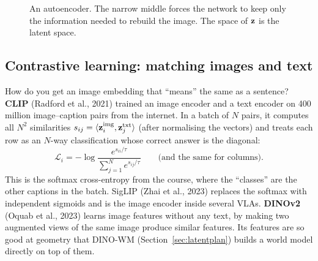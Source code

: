 \begin{figure}[h]
\centering
{}
\caption{An autoencoder. The narrow middle forces the network to keep only the information needed to rebuild the image. The space of $\mathbf{z}$ is the latent space.}
\end{figure}

\subsection{Contrastive learning: matching images and text}
How do you get an image embedding that ``means'' the same as a sentence? \textbf{CLIP} (Radford et al., 2021) trained an image encoder and a text encoder on 400 million image--caption pairs from the internet. In a batch of $N$ pairs, it computes all $N^2$ similarities $s_{ij}=\langle \mathbf{z}^{\text{img}}_i,\mathbf{z}^{\text{txt}}_j\rangle$ (after normalising the vectors) and treats each row as an $N$-way classification whose correct answer is the diagonal:
\begin{equation}
\mathcal L_i=-\log\frac{e^{s_{ii}/\tau}}{\sum_{j=1}^N e^{s_{ij}/\tau}} \qquad\text{(and the same for columns).}
\end{equation}
This is the softmax cross-entropy from the course, where the ``classes'' are the other captions in the batch. SigLIP (Zhai et al., 2023) replaces the softmax with independent sigmoids and is the image encoder inside several VLAs. \textbf{DINOv2} (Oquab et al., 2023) learns image features without any text, by making two augmented views of the same image produce similar features. Its features are so good at geometry that DINO-WM (Section~\ref{sec:latentplan}) builds a world model directly on top of them.

